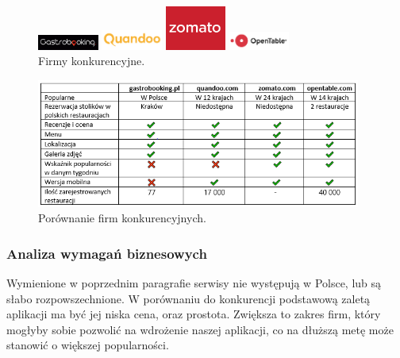 \documentclass{article}
\begin{document}
\begin{figure}[h]
\centering
		\begin{minipage}{2cm}
			\includegraphics[width=2cm]{firma1}
		\end{minipage}
		\begin{minipage}{2cm}
			\includegraphics[width=2cm]{firma2}
		\end{minipage}
		\begin{minipage}{2cm}
			\includegraphics[width=2cm]{firma3}
		\end{minipage}
		\begin{minipage}{2cm}
			\includegraphics[width=2cm]{firma4}
		\end{minipage}
	\caption{Firmy konkurencyjne.}
	\label{fig:firmy}
\end{figure}

\begin{figure}[h]
\centering
	\includegraphics[width=0.95\textwidth]{konkurencjaTabela}
	\caption{Porównanie firm konkurencyjnych.}
\end{figure}

\subsubsection{Analiza wymagań biznesowych}

Wymienione w poprzednim paragrafie serwisy nie występują w Polsce, lub są słabo rozpowszechnione. W porównaniu do konkurencji podstawową zaletą aplikacji ma być jej niska cena, oraz prostota. Zwiększa to zakres firm, który mogłyby sobie pozwolić na wdrożenie naszej aplikacji, co na dłuższą metę może stanowić o większej popularności.
\end{document}
